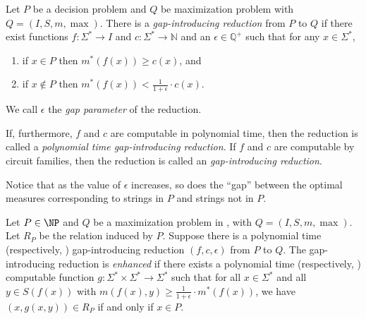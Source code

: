 \documentclass[]{article}
\begin{document}
\begin{definition}\label{def:intro}
  Let $P$ be a decision problem and $Q$ be maximization problem with $Q = (I, S, m, \max)$.
  There is a \emph{gap-introducing reduction} from $P$ to $Q$ if there exist functions $f \colon \Sigma^* \to I$ and $c \colon \Sigma^* \to \mathbb{N}$ and an $\epsilon \in \mathbb{Q}^+$ such that for any $x \in \Sigma^*$,
  \begin{enumerate}
  \item if $x \in P$ then $m^*(f(x)) \geq c(x)$, and
  \item if $x \notin P$ then $m^*(f(x)) < \frac{1}{1 + \epsilon} \cdot c(x)$.
  \end{enumerate}
  We call $\epsilon$ the \emph{gap parameter} of the reduction.

  If, furthermore, $f$ and $c$ are computable in polynomial time, then the reduction is called a \emph{polynomial time gap-introducing reduction}.
  If $f$ and $c$ are computable by \FNC{} circuit families, then the reduction is called an \emph{\NC{} gap-introducing reduction}.
\end{definition}

Notice that as the value of $\epsilon$ increases, so does the ``gap'' between the optimal measures corresponding to strings in $P$ and strings not in $P$.

\begin{definition}
  Let $P\in\NP$ and $Q$ be a maximization problem in \NPO, with $Q = (I, S, m, \max)$.
  Let $R_P$ be the \NP{} relation induced by $P$.
  Suppose there is a polynomial time (respectively, \NC) gap-introducing reduction $(f, c, \epsilon)$ from $P$ to $Q$.
  The gap-introducing reduction is \emph{enhanced} if there exists a polynomial time (respectively, \NC) computable function $g \colon \Sigma^* \times \Sigma^* \to \Sigma^*$ such that for all $x \in \Sigma^*$ and all $y \in S(f(x))$ with $m(f(x), y) \geq \frac{1}{1 + \epsilon} \cdot m^*(f(x))$, we have $\left(x, g(x, y)\right) \in R_P$ if and only if $x \in P$.
\end{definition}

\end{document}
